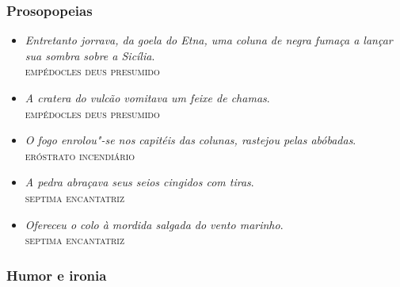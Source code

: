 \documentclass[12pt]{extarticle}
\begin{document}
\subsubsection{Prosopopeias}

\begin{itemize}
\item\emph{Entretanto jorrava, da goela do Etna, uma coluna de negra fumaça
a lançar sua sombra sobre a Sicília}.\\
\textsc{empédocles deus presumido}

\item\emph{A cratera do vulcão vomitava um feixe de chamas}.\\
\textsc{empédocles deus presumido}

\item\emph{O fogo enrolou"-se nos capitéis das colunas, rastejou pelas
abóbadas}.\\
\textsc{eróstrato incendiário}

\item\emph{A pedra abraçava seus seios cingidos com tiras}.\\
\textsc{septima encantatriz}

\item\emph{Ofereceu o colo à mordida salgada do vento marinho}.\\
\textsc{septima encantatriz}

\end{itemize}

\subsubsection{Humor e ironia}
\end{document}
